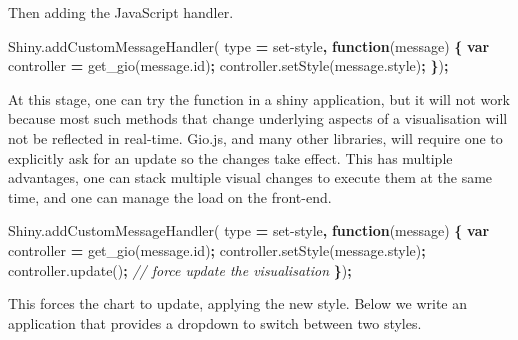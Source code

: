 \documentclass[
]{krantz}
\makeatletter
\newenvironment{Shaded}{\begin{snugshade}}{\end{snugshade}}
\newcommand{\AttributeTok}[1]{\textcolor[rgb]{0.61,0.61,0.61}{#1}}
\newcommand{\CommentTok}[1]{\textcolor[rgb]{0.37,0.37,0.37}{\textit{#1}}}
\newcommand{\KeywordTok}[1]{\textcolor[rgb]{0.27,0.27,0.27}{\textbf{#1}}}
\newcommand{\NormalTok}[1]{#1}
\newcommand{\OperatorTok}[1]{\textcolor[rgb]{0.43,0.43,0.43}{\textbf{#1}}}
\newcommand{\StringTok}[1]{\textcolor[rgb]{0.5,0.5,0.5}{#1}}
\newcommand{\VariableTok}[1]{\textcolor[rgb]{0,0,0}{#1}}
\newenvironment{kframe}{%
\medskip{}
\setlength{\fboxsep}{.8em}
 \def\at@end@of@kframe{}%
 \ifinner\ifhmode%
  \def\at@end@of@kframe{\end{minipage}}%
  \begin{minipage}{\columnwidth}%
 \fi\fi%
 \def\FrameCommand##1{\hskip\@totalleftmargin \hskip-\fboxsep
 \colorbox{shadecolor}{##1}\hskip-\fboxsep
     \hskip-\linewidth \hskip-\@totalleftmargin \hskip\columnwidth}%
 \MakeFramed {\advance\hsize-\width
   \@totalleftmargin\z@ \linewidth\hsize
   \@setminipage}}%
 {\par\unskip\endMakeFramed%
 \at@end@of@kframe}
\renewenvironment{Shaded}{\begin{kframe}}{\end{kframe}}
\makeatother
\begin{document}
Then adding the JavaScript handler.

\begin{Shaded}
\begin{Highlighting}[]
\VariableTok{Shiny}\NormalTok{.}\AttributeTok{addCustomMessageHandler}\NormalTok{(}
\NormalTok{  type }\OperatorTok{=} \StringTok{\textquotesingle{}set{-}style\textquotesingle{}}\OperatorTok{,} \KeywordTok{function}\NormalTok{(message) }\OperatorTok{\{}
    \KeywordTok{var}\NormalTok{ controller }\OperatorTok{=} \AttributeTok{get\_gio}\NormalTok{(}\VariableTok{message}\NormalTok{.}\AttributeTok{id}\NormalTok{)}\OperatorTok{;}
    \VariableTok{controller}\NormalTok{.}\AttributeTok{setStyle}\NormalTok{(}\VariableTok{message}\NormalTok{.}\AttributeTok{style}\NormalTok{)}\OperatorTok{;}
\OperatorTok{\}}\NormalTok{)}\OperatorTok{;}
\end{Highlighting}
\end{Shaded}

At this stage, one can try the function in a shiny application, but it will not work because most such methods that change underlying aspects of a visualisation will not be reflected in real-time. Gio.js, and many other libraries, will require one to explicitly ask for an update so the changes take effect. This has multiple advantages, one can stack multiple visual changes to execute them at the same time, and one can manage the load on the front-end.

\begin{Shaded}
\begin{Highlighting}[]
\VariableTok{Shiny}\NormalTok{.}\AttributeTok{addCustomMessageHandler}\NormalTok{(}
\NormalTok{  type }\OperatorTok{=} \StringTok{\textquotesingle{}set{-}style\textquotesingle{}}\OperatorTok{,} \KeywordTok{function}\NormalTok{(message) }\OperatorTok{\{}
    \KeywordTok{var}\NormalTok{ controller }\OperatorTok{=} \AttributeTok{get\_gio}\NormalTok{(}\VariableTok{message}\NormalTok{.}\AttributeTok{id}\NormalTok{)}\OperatorTok{;}
    \VariableTok{controller}\NormalTok{.}\AttributeTok{setStyle}\NormalTok{(}\VariableTok{message}\NormalTok{.}\AttributeTok{style}\NormalTok{)}\OperatorTok{;}
    \VariableTok{controller}\NormalTok{.}\AttributeTok{update}\NormalTok{()}\OperatorTok{;} \CommentTok{// force update the visualisation}
\OperatorTok{\}}\NormalTok{)}\OperatorTok{;}
\end{Highlighting}
\end{Shaded}

This forces the chart to update, applying the new style. Below we write an application that provides a dropdown to switch between two styles.
\end{document}
